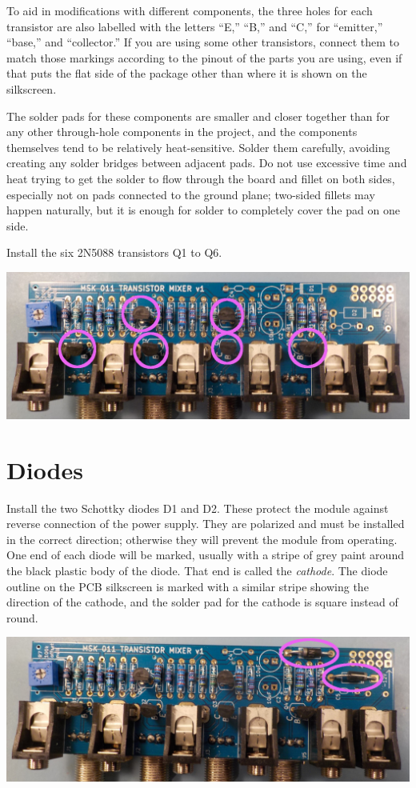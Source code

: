 To aid in modifications with different components, the three holes for each
transistor are also labelled with the letters ``E,'' ``B,'' and ``C,'' for
``emitter,'' ``base,'' and ``collector.''  If you are using some other
transistors, connect them to match those markings according to the pinout of
the parts you are using, even if that puts the flat side of the package other
than where it is shown on the silkscreen.

The solder pads for these components are smaller and closer together than
for any other through-hole components in the project, and the components
themselves tend to be relatively heat-sensitive.  Solder them carefully,
avoiding creating any solder bridges between adjacent pads.  Do not use
excessive time and heat trying to get the solder to flow through the board
and fillet on both sides, especially not on pads connected to the ground
plane; two-sided fillets may happen naturally, but it is enough for solder
to completely cover the pad on one side.

Install the six 2N5088 transistors Q1 to Q6.

\nopagebreak
\noindent\includegraphics[width=\linewidth]{2n5088.jpg}

\section{Diodes}

Install the two Schottky diodes D1 and D2.  These protect the module against
reverse connection of the power supply.  They are polarized and must be
installed in the correct direction; otherwise they will prevent the module
from operating.  One end of each diode will be marked, usually with a stripe
of grey paint around the black plastic body of the diode.  That end is
called the
\emph{cathode}.  The diode outline on the PCB silkscreen is marked with a
similar stripe showing the direction of the cathode, and the solder pad for
the cathode is square instead of round.

\nopagebreak
\noindent\includegraphics[width=\linewidth]{schottky.jpg}

